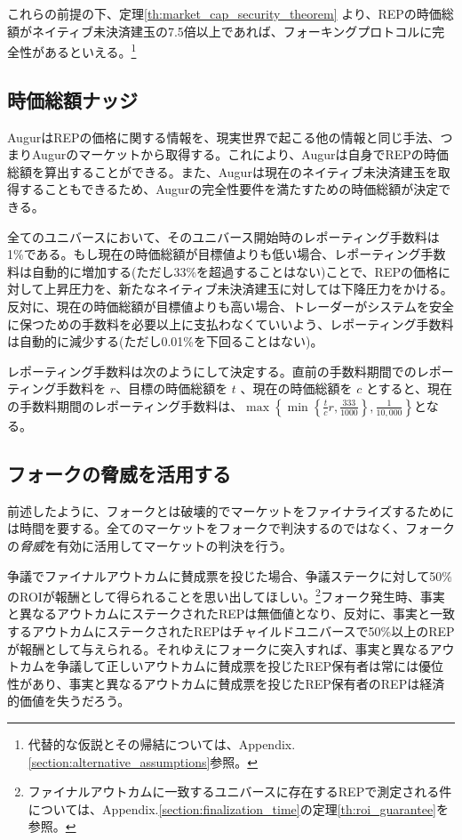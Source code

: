 \documentclass[floatfix,reprint,nofootinbib,amsmath,amssymb,epsfig,pre,floats,letterpaper,groupedaffiliation]{revtex4-1}
\theoremstyle{definition}
\theoremstyle{definition}
\theoremstyle{definition}
\begin{document}
これらの前提の下、定理\ref{th:market_cap_security_theorem} より、REPの時価総額がネイティブ未決済建玉の7.5倍以上であれば、フォーキングプロトコルに完全性があるといえる。\footnote{代替的な仮説とその帰結については、Appendix.\ref{section:alternative_assumptions}参照。}

\subsection{時価総額ナッジ}\label{section:market_cap_nudges}

AugurはREPの価格に関する情報を、現実世界で起こる他の情報と同じ手法、つまりAugurのマーケットから取得する。これにより、Augurは自身でREPの時価総額を算出することができる。また、Augurは現在のネイティブ未決済建玉を取得することもできるため、Augurの完全性要件を満たすための時価総額が決定できる。

全てのユニバースにおいて、そのユニバース開始時のレポーティング手数料は1\%である。もし現在の時価総額が目標値よりも低い場合、レポーティング手数料は自動的に増加する(ただし33\%を超過することはない)ことで、REPの価格に対して上昇圧力を、新たなネイティブ未決済建玉に対しては下降圧力をかける。反対に、現在の時価総額が目標値よりも高い場合、トレーダーがシステムを安全に保つための手数料を必要以上に支払わなくていいよう、レポーティング手数料は自動的に減少する(ただし0.01\%を下回ることはない)。

レポーティング手数料は次のようにして決定する。直前の手数料期間でのレポーティング手数料を $r$、目標の時価総額を $t$ 、現在の時価総額を $c$ とすると、現在の手数料期間のレポーティング手数料は、$\max\left\{ \min\left\{\frac{t}{c}r, \frac{333}{1000}\right\} , \frac{1}{10,000}\right\}$となる。

\subsection{フォークの脅威を活用する}\label{section:leveraging_the_threat_of_a_fork}

前述したように、フォークとは破壊的でマーケットをファイナライズするためには時間を要する。全てのマーケットをフォークで判決するのではなく、フォークの\textit{脅威}を有効に活用してマーケットの判決を行う。

争議でファイナルアウトカムに賛成票を投じた場合、争議ステークに対して50\%のROIが報酬として得られることを思い出してほしい。\footnote{ファイナルアウトカムに一致するユニバースに存在するREPで測定される件については、Appendix.\ref{section:finalization_time}の定理\ref{th:roi_guarantee}を参照。}フォーク発生時、事実と異なるアウトカムにステークされたREPは無価値となり、反対に、事実と一致するアウトカムにステークされたREPはチャイルドユニバースで50\%以上のREPが報酬として与えられる。それゆえにフォークに突入すれば、事実と異なるアウトカムを争議して正しいアウトカムに賛成票を投じたREP保有者は常には優位性があり、事実と異なるアウトカムに賛成票を投じたREP保有者のREPは経済的価値を失うだろう。
\end{document}
